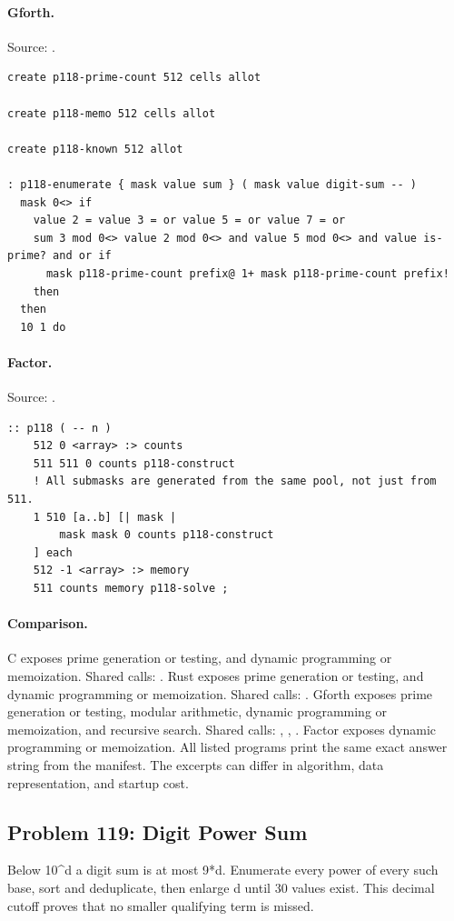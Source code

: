 \paragraph{Gforth.} Source: .
\begin{lstlisting}
create p118-prime-count 512 cells allot

create p118-memo 512 cells allot

create p118-known 512 allot

: p118-enumerate { mask value sum } ( mask value digit-sum -- )
  mask 0<> if
    value 2 = value 3 = or value 5 = or value 7 = or
    sum 3 mod 0<> value 2 mod 0<> and value 5 mod 0<> and value is-prime? and or if
      mask p118-prime-count prefix@ 1+ mask p118-prime-count prefix!
    then
  then
  10 1 do
\end{lstlisting}

\paragraph{Factor.} Source: .
\begin{lstlisting}
:: p118 ( -- n )
    512 0 <array> :> counts
    511 511 0 counts p118-construct
    ! All submasks are generated from the same pool, not just from 511.
    1 510 [a..b] [| mask |
        mask mask 0 counts p118-construct
    ] each
    512 -1 <array> :> memory
    511 counts memory p118-solve ;
\end{lstlisting}

\paragraph{Comparison.}
C exposes prime generation or testing, and dynamic programming or memoization. Shared calls: \texttt{}. Rust exposes prime generation or testing, and dynamic programming or memoization. Shared calls: \texttt{}. Gforth exposes prime generation or testing, modular arithmetic, dynamic programming or memoization, and recursive search. Shared calls: \texttt{}, \texttt{}, \texttt{}. Factor exposes dynamic programming or memoization.
All listed programs print the same exact answer string from the manifest. The excerpts can differ in algorithm, data representation, and startup cost.

\subsection{Problem 119: Digit Power Sum}
\label{walkthrough:p119}
Below 10\textasciicircum{}d a digit sum is at most 9*d. Enumerate every power of every such base, sort and deduplicate, then enlarge d until 30 values exist. This decimal cutoff proves that no smaller qualifying term is missed.

